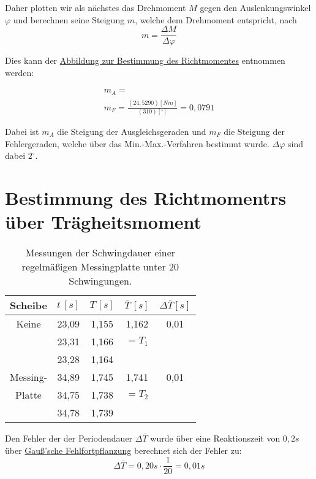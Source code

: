 Daher plotten wir als nächstes das Drehmoment $M$ gegen den Auslenkungswinkel $\varphi$ und berechnen seine Steigung $m$, welche dem Drehmoment entspricht, nach
\begin{equation}
    m = \frac{\Delta M}{\Delta \varphi}
\end{equation}

Dies kann der \hyperref[]{Abbildung zur Bestimmung des Richtmomentes} entnommen werden: 

\begin{align}
    m_A = \frac{}{} \\
    m_F = \frac{(24,5290) [Nm]}{(310) [^\circ]} = 0,0791
\end{align}

Dabei ist $m_A$ die Steigung der Ausgleichsgeraden und $m_F$ die Steigung der Fehlergeraden, welche über das Min.-Max.-Verfahren bestimmt wurde. $\Delta \varphi$ sind dabei $2^\circ$.

\section{Bestimmung des Richtmomentrs über Trägheitsmoment}

\begin{table}[h!]
    \begin{tabular}{c | c | c | c | c}
    Scheibe & $t \, [s]$& $T \, [s]$ & $\bar{T} \, [s]$ & $\Delta \bar{T} [s]$\\
    \hline
    Keine       & 23,09 & 1,155 & 1,162 & 0,01\\
                & 23,31 & 1,166 & $= T_1$ & \\
                & 23,28 & 1,164 &  & \\
     \hline
    Messing-    & 34,89 & 1,745 & 1,741 & 0,01\\
    Platte      & 34,75 & 1,738 & $= T_2$ & \\
                & 34,78 & 1,739 &  & \\
    \hline
    \end{tabular}
    \caption{Messungen der Schwingdauer einer regelmäßigen Messingplatte unter 20 Schwingungen.}
    \label{tab:regelmäßige_messingplatte}
\end{table}

Den Fehler der der Periodendauer $\Delta \bar{T}$ wurde über eine Reaktionszeit von $0,2s$ über \hyperref[eq:gauss_fehlfortpflanzung]{Gauß'sche Fehlfortpflanzung} berechnet sich der Fehler zu:
\begin{equation}
    \Delta \bar{T} = 0,20s \cdot \frac{1}{20} = 0,01s
\end{equation}

